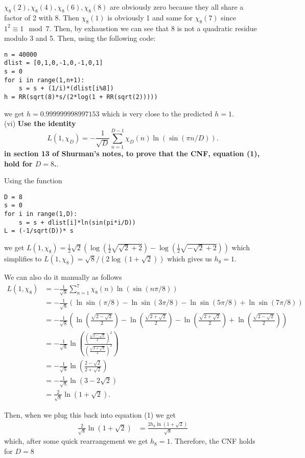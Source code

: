 \documentclass[12pt]{amsart}
\theoremstyle{definition}
\theoremstyle{remark}
\begin{document}
    $\chi_8(2),\chi_8(4),\chi_8(6),\chi_8(8)$ are obviously zero because they all share a factor of 2 with 8. Then $\chi_8(1)$ is obviously 1 and same for $\chi_8(7)$ since $1^2 \equiv 1\mod 7$. Then, by exhaustion we can see that 8 is not a quadratic residue modulo 3 and 5. Then, using the following code:
            \begin{lstlisting}[style = Python]
n = 40000
dlist = [0,1,0,-1,0,-1,0,1]
s = 0
for i in range(1,n+1):
    s = s + (1/i)*(dlist[i%8])
h = RR(sqrt(8)*s/(2*log(1 + RR(sqrt(2)))))
        \end{lstlisting}
        we get $h = 0.999999998997153$ which is very close to the predicted $h=1$.\\
        
\qquad(vi) \textbf{Use the identity
$$L(1,\chi_D) = -\frac{1}{\sqrt{D}}\sum_{n=1}^{D-1}\chi_D(n)\ln(\sin(\pi n/D)).$$
in section 13 of Shurman’s notes, to prove that the CNF, equation (1), hold for $D = 8$.}.

Using the function 
            \begin{lstlisting}[style = Python]
D = 8
s = 0
for i in range(1,D):
    s = s + dlist[i]*ln(sin(pi*i/D))
L = (-1/sqrt(D))* s
        \end{lstlisting}
    
    we get $L(1,\chi_8) = \frac{1}{2}\sqrt{2}(\log(\frac{1}{2}\sqrt{\sqrt{2} + 2}) - \log(\frac{1}{2}\sqrt{-\sqrt{2} + 2}))$ which simplifies to $L(1,\chi_8) = \sqrt{8}/(2\log(1+\sqrt{2}))$ which gives us $h_8 = 1$.
    
    We can also do it manually as follows 
    \begin{align*}
        L(1,\chi_8) &= -\frac{1}{\sqrt{8}} \sum_{n=1}^7 \chi_8(n)\ln(\sin(n\pi/8))\\
        &= -\frac{1}{\sqrt{8}} \left(\ln\sin(\pi/8) - \ln\sin(3\pi/8) - \ln\sin(5\pi/8) + \ln\sin(7\pi/8)\right)\\
        &=-\frac{1}{\sqrt{8}}\left(\ln\left(\frac{\sqrt{2-\sqrt{2}}}{2}\right) - \ln\left(\frac{\sqrt{2+\sqrt{2}}}{2}\right) - \ln\left(\frac{\sqrt{2+\sqrt{2}}}{2}\right) + \ln\left(\frac{\sqrt{2-\sqrt{2}}}{2}\right)\right)\\
        &= -\frac{1}{\sqrt{8}}\ln\left(\frac{(\frac{\sqrt{2-\sqrt{2}}}{2})^2}{(\frac{\sqrt{2+\sqrt{2}}}{2})^2}\right)\\
        &= -\frac{1}{\sqrt{8}}\ln\left(\frac{2-\sqrt{2}}{2+\sqrt{2}}\right)\\
        &= -\frac{1}{\sqrt{8}}\ln(3-2\sqrt{2})\\
        &= \frac{2}{\sqrt{8}}\ln(1+\sqrt{2}).
    \end{align*}
    
    Then, when we plug this back into equation (1) we get 
    \begin{align*}
        \frac{2}{\sqrt{8}}\ln(1+\sqrt{2}) &= \frac{2h_8\ln(1+\sqrt{2})}{\sqrt{8}}
    \end{align*}
    which, after some quick rearrangement we get $h_8 = 1$. Therefore, the CNF holds for $D = 8$
\end{document}
